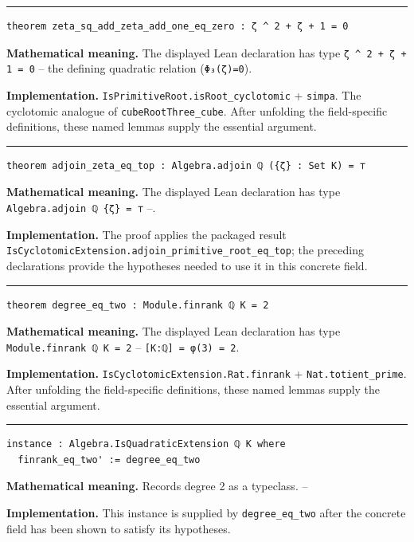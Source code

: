 \documentclass[UTF8,a4paper,11pt,fontset=fandol]{ctexart}
\theoremstyle{definition}
\newcommand{\statementsep}{\par\medskip\hrule\medskip}
\begin{document}
\statementsep
\begin{verbatim}
theorem zeta_sq_add_zeta_add_one_eq_zero : ζ ^ 2 + ζ + 1 = 0
\end{verbatim}
\noindent\textbf{Mathematical meaning.} The displayed Lean declaration has type \texttt{ζ \textasciicircum{} 2 + ζ + 1 = 0} -- the defining quadratic relation (\texttt{Φ₃(ζ)=0}).\par
\noindent\textbf{Implementation.} \texttt{IsPrimitiveRoot.\allowbreak{}isRoot\_\allowbreak{}cyclotomic} + \texttt{simpa}. The cyclotomic analogue of \texttt{cubeRootThree\_\allowbreak{}cube}. After unfolding the field-specific definitions, these named lemmas supply the essential argument.\par
\statementsep
\begin{verbatim}
theorem adjoin_zeta_eq_top : Algebra.adjoin ℚ ({ζ} : Set K) = ⊤
\end{verbatim}
\noindent\textbf{Mathematical meaning.} The displayed Lean declaration has type \texttt{Algebra.\allowbreak{}adjoin ℚ \{ζ\} = ⊤} --.\par
\noindent\textbf{Implementation.} The proof applies the packaged result \texttt{IsCyclotomicExtension.\allowbreak{}adjoin\_\allowbreak{}primitive\_\allowbreak{}root\_\allowbreak{}eq\_\allowbreak{}top}; the preceding declarations provide the hypotheses needed to use it in this concrete field.\par
\statementsep
\begin{verbatim}
theorem degree_eq_two : Module.finrank ℚ K = 2
\end{verbatim}
\noindent\textbf{Mathematical meaning.} The displayed Lean declaration has type \texttt{Module.\allowbreak{}finrank ℚ K = 2} -- \texttt{[K:ℚ] = φ(3) = 2}.\par
\noindent\textbf{Implementation.} \texttt{IsCyclotomicExtension.\allowbreak{}Rat.\allowbreak{}finrank} + \texttt{Nat.\allowbreak{}totient\_\allowbreak{}prime}. After unfolding the field-specific definitions, these named lemmas supply the essential argument.\par
\statementsep
\begin{verbatim}
instance : Algebra.IsQuadraticExtension ℚ K where
  finrank_eq_two' := degree_eq_two
\end{verbatim}
\noindent\textbf{Mathematical meaning.} Records degree 2 as a typeclass. --\par
\noindent\textbf{Implementation.} This instance is supplied by \texttt{degree\_\allowbreak{}eq\_\allowbreak{}two} after the concrete field has been shown to satisfy its hypotheses.\par
\end{document}
